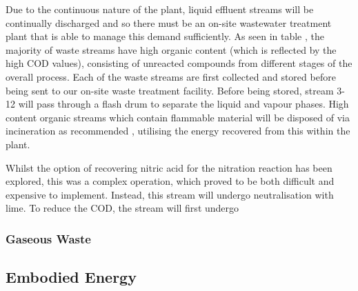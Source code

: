 Due to the continuous nature of the plant, liquid effluent streams will be continually discharged and so there must be an on-site wastewater treatment plant that is able to manage this demand sufficiently. As seen in table %
, the majority of waste streams have high organic content (which is reflected by the high COD values), consisting of unreacted compounds from different stages of the overall process. Each of the waste streams are first collected and stored before being sent to our on-site waste treatment facility. Before being stored, stream 3-12 will pass through a flash drum to separate the liquid and vapour phases. High content organic streams which contain flammable material will be disposed of via incineration as recommended \cite{sinnott_coulson_2005}, utilising the energy recovered from this within the plant. %






Whilst the option of recovering nitric acid for the nitration reaction has been explored, this was a complex operation, which proved to be both difficult and expensive to implement. Instead, this stream will undergo neutralisation with lime. To reduce the COD, the stream will first undergo













\subsubsection{Gaseous Waste}

\subsection{Embodied Energy}